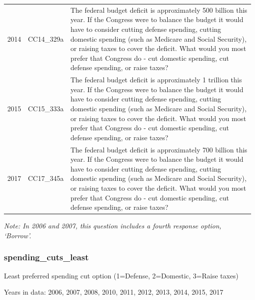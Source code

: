 \documentclass[12pt]{article}
\begin{document}
\begin{longtable}[t]{rl>{\raggedright\arraybackslash}p{10cm}}
2014 & CC14\_329a & The federal budget deficit is approximately 500 billion this year. If the Congress were to balance the budget it would have to consider cutting defense spending, cutting domestic spending (such as Medicare and Social Security), or raising taxes to cover the deficit. What would you most prefer that Congress do - cut domestic spending, cut defense spending, or raise taxes?\\
2015 & CC15\_333a & The federal budget deficit is approximately 1 trillion this year. If the Congress were to balance the budget it would have to consider cutting defense spending, cutting domestic spending (such as Medicare and Social Security), or raising taxes to cover the deficit. What would you most prefer that Congress do - cut domestic spending, cut defense spending, or raise taxes?\\
2017 & CC17\_345a & The federal budget deficit is approximately 700 billion this year. If the Congress were to balance the budget it would have to consider cutting defense spending, cutting domestic spending (such as Medicare and Social Security), or raising taxes to cover the deficit. What would you most prefer that Congress do - cut domestic spending, cut defense spending, or raise taxes?\\*
\end{longtable}

\emph{Note: In 2006 and 2007, this question includes a fourth response
option, `Borrow'.}

\subsubsection{spending\_cuts\_least}\label{spending_cuts_least}

Least preferred spending cut option (1=Defense, 2=Domestic, 3=Raise
taxes)

Years in data: 2006, 2007, 2008, 2010, 2011, 2012, 2013, 2014, 2015,
2017\begingroup\fontsize{10}{12}\selectfont
\end{document}
